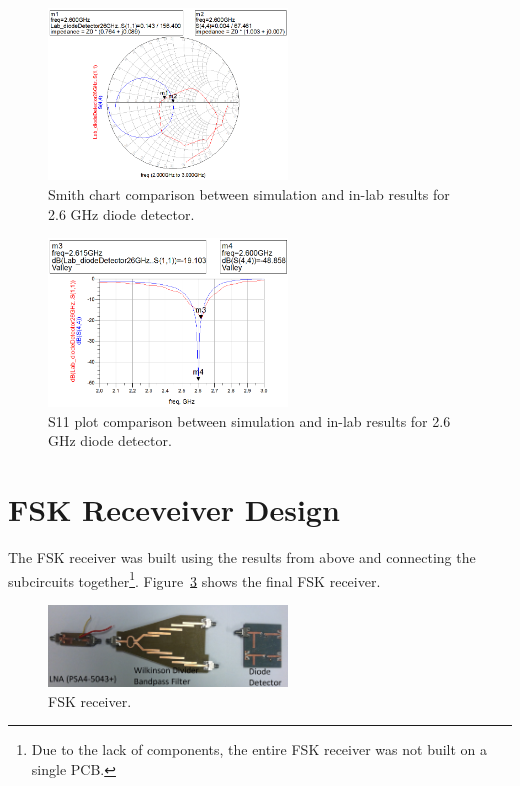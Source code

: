 \documentclass[conference]{IEEEtran}
\begin{document}
\begin{figure}[!htb]
\centering
\includegraphics[width=2.5in]{diode-pics/diodedetectorLab26Smith.png}
\caption{Smith chart comparison between simulation and in-lab results for 2.6 GHz diode detector.}
\label{fig:resultSmith26}
\end{figure}

\begin{figure}[!htb]
\centering
\includegraphics[width=2.5in]{diode-pics/diodedetectorLab26S11.png}
\caption{S11 plot comparison between simulation and in-lab results for 2.6 GHz diode detector.}
\label{fig:resultS1126}
\end{figure}

\section{FSK Receveiver Design}
The FSK receiver was built using the results from above and connecting the subcircuits together\footnote{Due to the lack of components, the entire FSK receiver was not built on a single PCB.}.  Figure~\ref{fig:fsk} shows the final FSK receiver.

\begin{figure}[!htb]
\centering
\includegraphics[width=2.5in]{fsk.jpg}
\caption{FSK receiver.}
\label{fig:fsk}
\end{figure}
\end{document}
